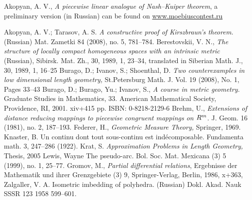 \documentclass[oneside,a4paper]{article}
\begin{document}
\begin{thebibliography}{52} 
 Akopyan, A. V.,
\textit{A piecewise linear analogue of Nash--Kuiper theorem},
a preliminary version (in Russian) can be found on
\href{http://www.moebiuscontest.ru/files/2007/akopyan.pdf}{www.moebiuscontest.ru}

 Akopyan, A. V.; Tarasov, A. S.
\textit{A constructive proof of Kirszbraun's theorem.} 
(Russian) Mat. Zametki 84 (2008), no. 5, 781--784. 
 Berestovskii, V. N.,
   \textit{The structure of locally compact homogeneous spaces with an
   intrinsic metric} (Russian),
   {Sibirsk. Mat. Zh.},
   {30},
   {1989},
   {1},
   {23--34},
   translated in
   {Siberian Math. J.},
      {30},
      {1989},
      {1},
    {16--25}
 Burago, D.; Ivanov, S.; Shoenthal, D.   \textit{Two counterexamples in low dimensional length geometry,}
St.Petersburg Math. J. Vol. 19 (2008), No. 1, Pages 33--43
 Burago, D.; Burago, Yu.; Ivanov, S., \textit{A course in metric geometry.} Graduate Studies in Mathematics, 33. American Mathematical Society, Providence, RI, 2001. xiv+415 pp. ISBN: 0-8218-2129-6
 Brehm, U., \textit{Extensions of distance reducing mappings to piecewise congruent mappings on $R\sp{m}$.}  J. Geom.  16  (1981), no. 2, 187--193.
 Federer, H., \textit{Geometric Measure Theory,} Springer, 1969.
 Knaster, B. Un continu dont tout sous-continu est ind\'ecomposable. Fundamenta math. 3, 247--286 (1922).
 Krat, S. \textit{Approximation Problems in Length Geometry,} Thesis, 2005
Lewis, Wayne The pseudo-arc. Bol. Soc. Mat. Mexicana (3) 5 (1999), no. 1, 25--77.
  Gromov, M.,
\textit{Partial differential relations},
 Ergebnisse der Mathematik und ihrer Grenzgebiete (3) 
{9},
{Springer-Verlag},
 {Berlin},
 {1986},
 {x+363},
 Zalgaller, V. A. Isometric imbedding of polyhedra. (Russian)  Dokl. Akad. Nauk SSSR  123  1958 599--601.
\end{thebibliography}
\end{document}
